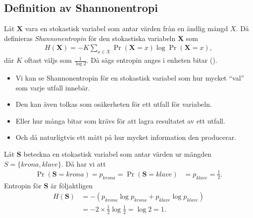 \documentclass{beamer}
\theoremstyle{definition}
\let\stoch\mathbf{}
\begin{document}
\subsection{Definition av Shannonentropi}

\begin{frame}{\insertsubsectionhead}
  \begin{definition}[Shannonentropi]
    Låt \(\stoch X\) vara en stokastisk variabel som antar värden från en 
    ändlig mängd \(X\).
    Då definieras \emph{Shannonentropin} för den stokastiska variabeln 
    \(\stoch X\) som
    \begin{align*}
      H(\stoch X) = -K \sum_{x\in X} \Pr(\stoch X = x)\log \Pr(\stoch X = x),
    \end{align*}
    där \(K\) oftast väljs som \(\frac{1}{\log 2}\).
    Då sägs entropin anges i enheten bitar (\bit).
  \end{definition}
\end{frame}

\begin{frame}{\insertsubsectionhead}
  \begin{itemize}
    \item Vi kan se Shannonentropin för en stokastisk variabel som hur mycket 
      \enquote{val} som varje utfall innebär.

    \item Den kan även tolkas som osäkerheten för ett utfall för variabeln.

    \item Eller hur många bitar som krävs för att lagra resultatet av ett 
      utfall.

    \item Och då naturligtvis ett mått på hur mycket information den 
      producerar.

  \end{itemize}
\end{frame}

\begin{frame}{\insertsubsectionhead}
  \begin{example}
    Låt \(\stoch S\) beteckna en stokastisk variabel som antar värden ur 
    mängden \(S = \{krona, klave\}\).
    Då har vi att
    \begin{align*}
      \Pr(\stoch S = krona) = p_{krona} = \Pr(\stoch S = klave) &= p_{klave} 
      = \frac{1}{2}.
    \end{align*}
    Entropin för \(\stoch S\) är följaktligen
    \begin{align*}
      H(\stoch S) &= -\left( p_{krona}\log p_{krona} + p_{klave}\log p_{klave} 
      \right) \\
        &= -2\times \frac{1}{2}\log \frac{1}{2} = \log 2 = 1.
    \end{align*}
  \end{example}
\end{frame}
\end{document}
